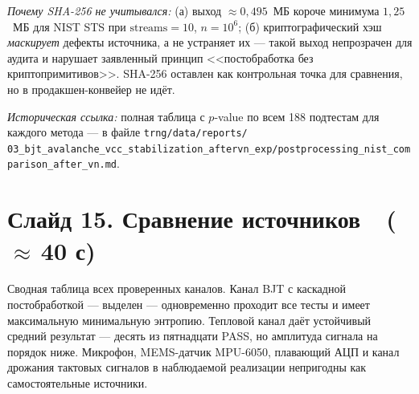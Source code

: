 \documentclass[12pt,a4paper]{extarticle}
\begin{document}
{\emph{Почему SHA-256 не учитывался:} (а) выход
$\approx 0{,}495$~МБ короче минимума $1{,}25$~МБ для NIST STS при
$\text{streams}{=}10$, $n{=}10^6$; (б) криптографический хэш
\emph{маскирует} дефекты источника, а не устраняет их --- такой выход
непрозрачен для аудита и нарушает заявленный принцип <<постобработка без
криптопримитивов>>. SHA-256 оставлен как контрольная точка для сравнения,
но в продакшен-конвейер не идёт.

\emph{Историческая ссылка:} полная таблица с $p$-value по всем 188
подтестам для каждого метода --- в файле \texttt{trng/data/reports/
03\_bjt\_avalanche\_vcc\_stabilization\_aftervn\_exp/postprocessing\_nist\_comparison\_after\_vn.md}.}

\section*{Слайд 15. Сравнение источников~~($\approx$\,40 с)}

Сводная таблица всех проверенных каналов. Канал BJT с каскадной
постобработкой --- выделен --- одновременно проходит все тесты и имеет
максимальную минимальную энтропию. Тепловой канал даёт устойчивый средний
результат --- десять из пятнадцати PASS, но амплитуда сигнала на порядок
ниже. Микрофон, MEMS-датчик MPU-6050, плавающий АЦП и канал дрожания
тактовых сигналов в наблюдаемой реализации непригодны как самостоятельные
источники.
\end{document}
